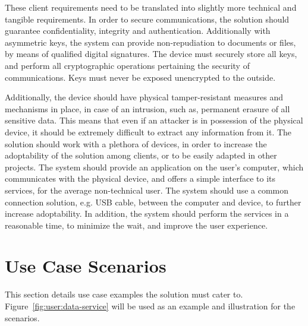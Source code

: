These client requirements need to be translated into slightly more technical and tangible requirements. In order to secure communications, the solution should guarantee confidentiality, integrity and authentication.
Additionally with asymmetric keys, the system can provide non-repudiation to documents or files, by means of qualified digital signatures.
The device must securely store all keys, and perform all cryptographic operations pertaining the security of communications. Keys must never be exposed unencrypted to the outside.

Additionally, the device should have physical tamper-resistant measures and mechanisms in place, in case of an intrusion, such as, permanent erasure of all sensitive data. 
This means that even if an attacker is in possession of the physical device, it should be extremely difficult to extract any information from it.
The solution should work with a plethora of devices, in order to increase the adoptability of the solution among clients, or to be easily adapted in other projects.
The system should provide an application on the user's computer, which communicates with the physical device, and offers a simple interface to its services, for the average non-technical user.
The system should use a common connection solution, e.g. USB cable, between the computer and device, to further increase adoptability.
In addition, the system should perform the services in a reasonable time, to minimize the wait, and improve the user experience.


\section{Use Case Scenarios}\label{chap:problem:scenarios}

This section details use case examples the solution must cater to. Figure~\ref{fig:user:data-service} will be used as an example and illustration for the scenarios.

